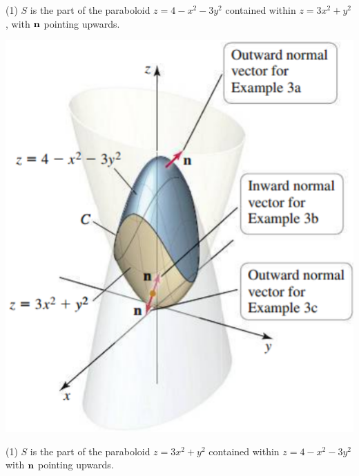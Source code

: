\documentclass[mathNotesPreamble]{subfiles}
\begin{document}
  \noindent
  \begin{minipage}[t]{0.55\linewidth}
    \begin{tasks}[after-item-skip=\stretch{1}, label=\textbullet, item-indent=0pt](1)
      \task $S$ is the part of the paraboloid $z=4-x^2-3y^2$ contained within $z=3x^2+y^2$, with ${\mathbf{n}}$ pointing upwards.
    \end{tasks}
  \end{minipage}%
  \begin{minipage}[t]{0.45\linewidth}\mbox{}
    \vspace*{-1.5\baselineskip}
    \begin{flushright}
      \includegraphics[width=0.78\linewidth]{images/briggs_17_07/fig17_63}
    \end{flushright}
  \end{minipage}%
  \begin{tasks}[after-item-skip=\stretch{1}, label=\textbullet, item-indent=0pt, resume](1)
    \task $S$ is the part of the paraboloid $z=3x^2+y^2$ contained within $z=4-x^2-3y^2$ with ${\mathbf{n}}$ pointing upwards.
  \end{tasks}
  \pagebreak
\end{document}
